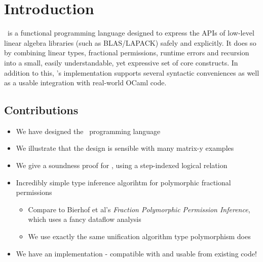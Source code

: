 \section{Introduction}

\lang\ is a functional programming language designed to express the APIs of
low-level linear algebra libraries (such as BLAS/LAPACK) safely and explicitly.
It does so by combining linear types, fractional permissions, runtime errors
and recursion into a small, easily understandable, yet expressive set of core
constructs. In addition to this, \lang's implementation supports several
syntactic conveniences as well as a usable integration with real-world OCaml
code.

\subsection{Contributions}
\begin{itemize}
    \item We have designed the \lang\ programming language
    \item We illustrate that the design is sensible with many matrix-y examples
    \item We give a soundness proof for \lang, using a step-indexed logical relation
    \item Incredibly simple type inference algorihtm for polymorphic fractional permissions
        \begin{itemize}
            \item Compare to Bierhof et al's \emph{Fraction Polymorphic Permission Inference},
                which uses a fancy dataflow analysis
            \item We use exactly the same unification algorithm type polymorphism does
        \end{itemize}
    \item We have an implementation - compatible with and usable from existing code!
\end{itemize}

